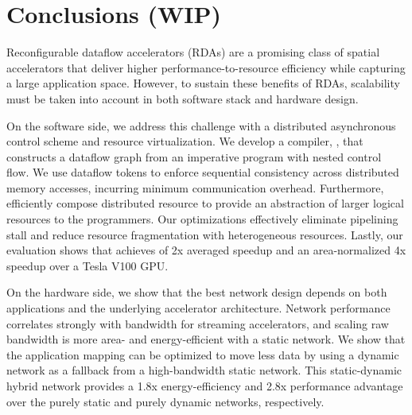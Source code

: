 \chapter{Conclusions (WIP)} \label{sec:conclusion}

Reconfigurable dataflow accelerators (RDAs) are a promising class of spatial accelerators that deliver higher performance-to-resource efficiency while capturing a large application space.
However, to sustain these benefits of RDAs, scalability must be taken into account in both software
stack and hardware design.

On the software side, we address this challenge with a distributed asynchronous control scheme and resource
virtualization.
We develop a compiler, \name{}, that constructs a dataflow graph from an imperative program with nested
control flow. We use dataflow tokens to enforce sequential consistency across distributed memory
accesses, incurring minimum communication overhead.
Furthermore, \name efficiently compose distributed resource to provide an abstraction of larger
logical resources to the programmers.
Our optimizations effectively eliminate pipelining stall and reduce resource fragmentation with
heterogeneous resources.
Lastly, our evaluation shows that \name{} achieves of 2x averaged speedup and an area-normalized 4x
speedup over a Tesla V100 GPU.

On the hardware side, we show that the best network design depends on both applications and the underlying accelerator architecture.
Network performance correlates strongly with bandwidth for streaming accelerators, and scaling raw bandwidth is more area- and energy-efficient with a static network.
We show that the application mapping can be optimized to move less data by using a dynamic network as a fallback from a high-bandwidth static network.
This static-dynamic hybrid network provides a 1.8x energy-efficiency and
2.8x performance advantage over the purely static and purely dynamic networks, respectively.


